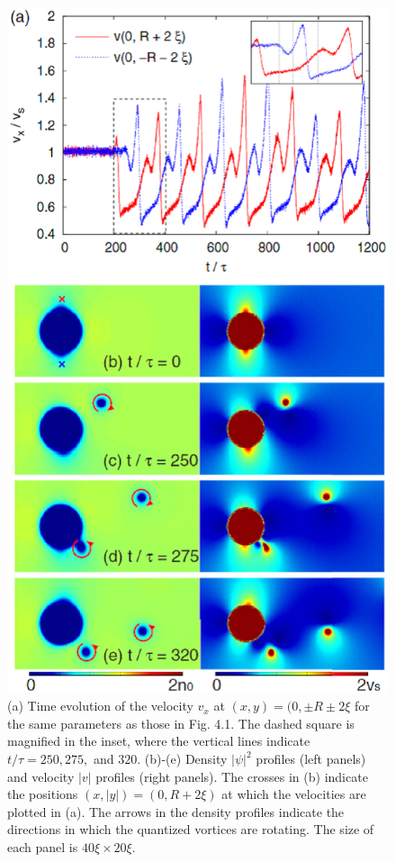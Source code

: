 \documentclass[12pt,a4paper]{report} %
\begin{document}
\begin{figure}[htbp]
\begin{center}
\includegraphics[scale=0.53, keepaspectratio]{4-2.eps}
\caption{
(a) Time evolution of the velocity $v_x$ at
$(x,y)=(0, \pm R \pm 2 \xi$ for the same parameters as those in Fig. 4.1.
The dashed square is magnified in the inset, where the vertical lines
indicate $t/\tau = 250,275,$ and $320$. (b)-(e) Density $|\psi|^2$ profiles (left
panels) and velocity $|v|$ profiles (right panels). The crosses in (b)
indicate the positions $(x,|y|)=(0,R+2 \xi)$ at which the velocities
are plotted in (a). The arrows in the density profiles indicate the
directions in which the quantized vortices are rotating. The size of
each panel is $40 \xi \times 20 \xi$.
}
\label{FIG:4-2}
\end{center}
\end{figure}
\end{document}
